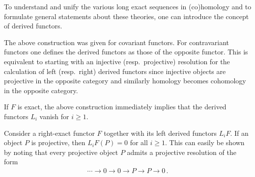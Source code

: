 	To understand and unify the various long exact sequences in (co)homology and to formulate general statements about these theories, one can introduce the concept of derived functors.

	\begin{remark}
        The above construction was given for covariant functors. For contravariant functors one defines the derived functors as those of the opposite functor. This is equivalent to starting with an injective (resp.~projective) resolution for the calculation of left (resp.~right) derived functors since injective objects are projective in the opposite category and similarly homology becomes cohomology in the opposite category.
    \end{remark}

	\begin{property}\label{homalg:exact_vanishing_derived_functor}
		If $F$ is exact, the above construction immediately implies that the derived functors $L_i$ vanish for $i\geq 1$.
	\end{property}

	\begin{property}\label{homalg:projective_object}
		Consider a right-exact functor $F$ together with its left derived functors $L_iF$. If an object $P$ is projective, then $L_iF(P)=0$ for all $i\geq1$. This can easily be shown by noting that every projective object $P$ admits a projective resolution of the form
		\begin{gather}
			\cdots\longrightarrow0\longrightarrow0\longrightarrow P\longrightarrow P\longrightarrow0\,.
		\end{gather}
	\end{property}

